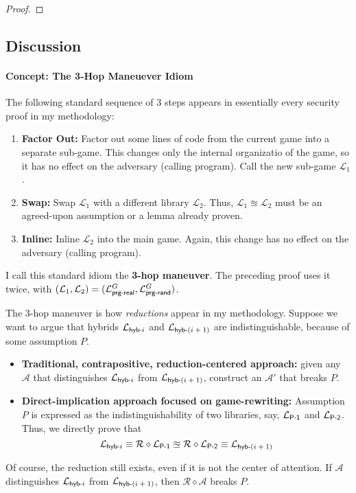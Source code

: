 \documentclass[11pt,letterpaper]{article}
\renewcommand{\L}{\mathcal{L}}
\newcommand{\lib}[1]{\mathcal{L}_{\textsf{\textup{#1}}}}
\newcommand{\link}{\diamond}
\newcommand{\indist}{\approxeq}
\newcommand{\A}{\mathcal{A}}
\newcommand{\hybproof}[1]{}
\renewcommand{\L}{\mathcal{L}}
\begin{document}
\begin{proof}
\hybproof{prg-feedback}
\end{proof}

\subsection{Discussion}

\paragraph{Concept: The 3-Hop Maneuever Idiom}

The following standard sequence of 3 steps appears in essentially every security proof in my methodology:
\begin{enumerate}
    \item \textbf{Factor Out:} 
        Factor out some lines of code from the current game into a separate sub-game.
        This changes only the internal organizatio of the game, so it has no effect on the adversary (calling program).
        Call the new sub-game $\L_1$.

    \item \textbf{Swap:}
        Swap $\L_1$ with a different library $\L_2$.
        Thus, $\L_1 \indist \L_2$ must be an agreed-upon assumption or a lemma already proven.

    \item \textbf{Inline:}
        Inline $\L_2$ into the main game.
        Again, this change has no effect on the adversary (calling program).
\end{enumerate}
I call this standard idiom the \textbf{3-hop maneuver}.
The preceding proof uses it twice, with $(\L_1, \L_2) = (\lib{prg-real}^G, \lib{prg-rand}^G)$.


\bigskip

The 3-hop maneuver is how \emph{reductions} appear in my methodology.
Suppose we want to argue that hybrids $\lib{hyb-$i$}$ and $\lib{hyb-$(i+1)$}$ are indistinguishable, because of some assumption $P$.
\begin{itemize}
    \item \textbf{Traditional, contrapositive, reduction-centered approach:}
        given any $\A$ that distinguishes $\lib{hyb-$i$}$ from $\lib{hyb-$(i+1)$}$, construct an $\A'$ that breaks $P$.

    \item \textbf{Direct-implication approach focused on game-rewriting:}
        Assumption $P$ is expressed as the indistinguishability of two libraries, say, $\lib{P-1}$ and $\lib{P-2}$.
        Thus, we directly prove that
        \[
            \lib{hyb-$i$} \equiv \mathcal{R} \link \lib{P-1} \indist \mathcal{R} \link \lib{P-2} \equiv \lib{hyb-$(i+1)$}
        \]
\end{itemize}
Of course, the reduction still exists, even if it is not the center of attention.
If $\A$ distinguishes $\lib{hyb-$i$}$ from $\lib{hyb-$(i+1)$}$, then $\mathcal{R} \link \A$ breaks $P$.
\end{document}
